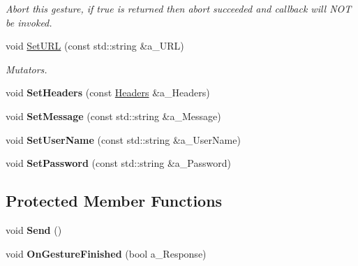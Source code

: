 \begin{DoxyCompactItemize}
\begin{DoxyCompactList}\small\item\em Abort this gesture, if true is returned then abort succeeded and callback will N\+OT be invoked. \end{DoxyCompactList}\item 
\mbox{\label{class_web_socket_gesture_a3b17656d09f94a42fda866927bad204b}} 
void \hyperlink{class_web_socket_gesture_a3b17656d09f94a42fda866927bad204b}{Set\+U\+RL} (const std\+::string \&a\+\_\+\+U\+RL)
\begin{DoxyCompactList}\small\item\em Mutators. \end{DoxyCompactList}\item 
\mbox{\label{class_web_socket_gesture_a4a4375e434499108b1c9f53b64ce60e3}} 
void {\bfseries Set\+Headers} (const \hyperlink{class_web_socket_gesture_a0cc08ce65d72a224166d68550a7979ed}{Headers} \&a\+\_\+\+Headers)
\item 
\mbox{\label{class_web_socket_gesture_aa4e55225c9580a0cf22cb01c54b56eea}} 
void {\bfseries Set\+Message} (const std\+::string \&a\+\_\+\+Message)
\item 
\mbox{\label{class_web_socket_gesture_a1ba04a96d95206bbb2edb535bd8425fa}} 
void {\bfseries Set\+User\+Name} (const std\+::string \&a\+\_\+\+User\+Name)
\item 
\mbox{\label{class_web_socket_gesture_a8150f54c04dd97765576a143cd251acc}} 
void {\bfseries Set\+Password} (const std\+::string \&a\+\_\+\+Password)
\end{DoxyCompactItemize}
\subsection*{Protected Member Functions}
\begin{DoxyCompactItemize}
\item 
\mbox{\label{class_web_socket_gesture_a0ec4375901d611be78bbf9c463a649ee}} 
void {\bfseries Send} ()
\item 
\mbox{\label{class_web_socket_gesture_a4328bfda5f07a81b6296019aecd80291}} 
void {\bfseries On\+Gesture\+Finished} (bool a\+\_\+\+Response)
\end{DoxyCompactItemize}

